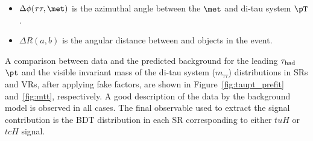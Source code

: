 \begin{itemize}
\item $\Delta\phi(\tau\tau,\met)$ is the azimuthal angle between the $\met$ and di-tau system $\pT$.
\item $\Delta R(a,b)$ is the angular distance between  and  objects in the event. 
\end{itemize}

A comparison between data and the predicted background for the leading $\tau_{\mathrm{had}}$ $\pt$  and the visible invariant mass of the di-tau system ($m_{\tau\tau}$)
distributions in SRs and VRs, after applying fake factors, 
are shown in Figure~\ref{fig:taupt_prefit} and~\ref{fig:mtt}, respectively.
A good description of the data by the background model is observed in all cases.
The final observable used to extract the signal contribution is the BDT distribution in each SR corresponding to either $tuH$ or $tcH$ signal.


